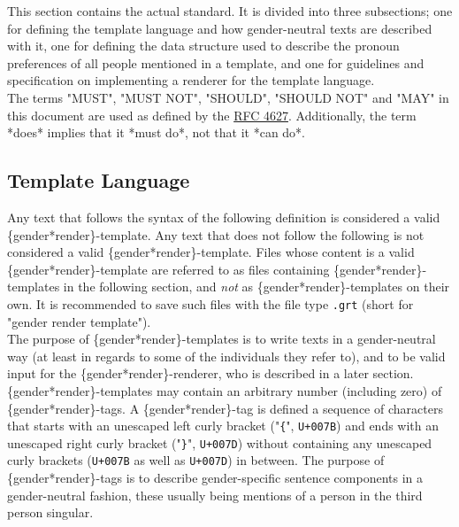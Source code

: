 \documentclass{article}
\begin{document}
    This section contains the actual standard.
    It is divided into three subsections;
    one for defining the template language and how gender-neutral texts are described with it,
    one for defining the data structure used to describe the pronoun preferences of all people mentioned in a template,
    and one for guidelines and specification on implementing a renderer for the template language.\\

    The terms "MUST", "MUST NOT", "SHOULD", "SHOULD NOT" and "MAY" in this document are used as defined by the \href{https://tools.ietf.org/html/rfc2119}{RFC 4627}.
    Additionally, the term *does* implies that it *must do*, not that it *can do*.

    \subsection{Template Language}

    Any text that follows the syntax of the following definition is considered a valid \{gender*render\}-template.
    Any text that does not follow the following is not considered a valid \{gender*render\}-template.
    Files whose content is a valid \{gender*render\}-template are referred to as files containing \{gender*render\}-templates in the following section, and \emph{not} as \{gender*render\}-templates on their own.
    It is recommended to save such files with the file type \texttt{.grt} (short for "gender render template").\\

    The purpose of \{gender*render\}-templates is to write texts in a gender-neutral way (at least in regards to some of the individuals they refer to), and to be valid input for the \{gender*render\}-renderer, who is described in a later section.\\

    \{gender*render\}-templates may contain an arbitrary number (including zero) of \{gender*render\}-tags.
    A \{gender*render\}-tag is defined a sequence of characters that starts with an unescaped left curly bracket ("\texttt{\{}", \texttt{U+007B}) and ends with an unescaped right curly bracket ("\texttt{\}}", \texttt{U+007D}) without containing any unescaped curly brackets (\texttt{U+007B} as well as \texttt{U+007D}) in between.
    The purpose of \{gender*render\}-tags is to describe gender-specific sentence components in a gender-neutral fashion, these usually being mentions of a person in the third person singular.\\
\end{document}
